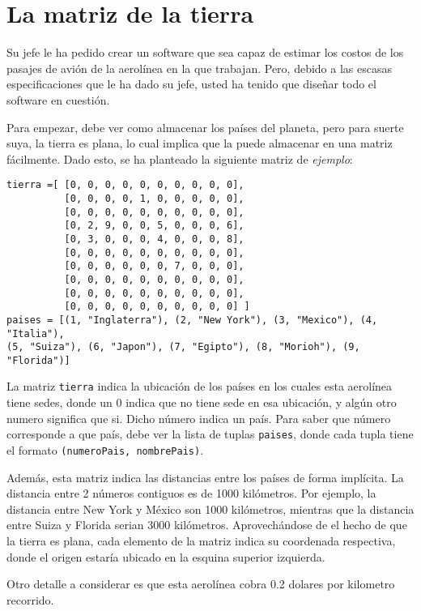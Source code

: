 \section{La matriz de la tierra}

Su jefe le ha pedido crear un software que sea capaz de estimar los costos de los pasajes de avión de la aerolínea en la que trabajan. Pero, debido a las escasas especificaciones que le ha dado su jefe, usted ha tenido que diseñar todo el software en cuestión.

Para empezar, debe ver como almacenar los países del planeta, pero para suerte suya, la tierra es plana, lo cual implica que la puede almacenar en una matriz fácilmente. Dado esto, se ha planteado la siguiente matriz de \textit{ejemplo}:

\begin{lstlisting}[style=consola]
tierra =[ [0, 0, 0, 0, 0, 0, 0, 0, 0, 0], 
          [0, 0, 0, 0, 1, 0, 0, 0, 0, 0], 
          [0, 0, 0, 0, 0, 0, 0, 0, 0, 0], 
          [0, 2, 9, 0, 0, 5, 0, 0, 0, 6], 
          [0, 3, 0, 0, 0, 4, 0, 0, 0, 8], 
          [0, 0, 0, 0, 0, 0, 0, 0, 0, 0], 
          [0, 0, 0, 0, 0, 0, 7, 0, 0, 0], 
          [0, 0, 0, 0, 0, 0, 0, 0, 0, 0], 
          [0, 0, 0, 0, 0, 0, 0, 0, 0, 0], 
          [0, 0, 0, 0, 0, 0, 0, 0, 0, 0] ]
paises = [(1, "Inglaterra"), (2, "New York"), (3, "Mexico"), (4, "Italia"), 
(5, "Suiza"), (6, "Japon"), (7, "Egipto"), (8, "Morioh"), (9, "Florida")]
\end{lstlisting}

La matriz \texttt{tierra} indica la ubicación de los países en los cuales esta aerolínea tiene sedes, donde un 0 indica que no tiene sede en esa ubicación, y algún otro numero significa que si. Dicho número indica un país. Para saber que número corresponde a que país, debe ver la lista de tuplas \texttt{paises}, donde cada tupla tiene el formato \texttt{(numeroPais, nombrePais)}.

Además, esta matriz indica las distancias entre los países de forma implícita. La distancia entre 2 números contiguos es de 1000 kilómetros. Por ejemplo, la distancia entre New York y México son 1000 kilómetros, mientras que la distancia entre Suiza y Florida serian 3000 kilómetros. Aprovechándose de el hecho de que la tierra es plana, cada elemento de la matriz indica su coordenada respectiva, donde el origen estaría ubicado en la esquina superior izquierda.

Otro detalle a considerar es que esta aerolínea cobra 0.2 dolares por kilometro recorrido.

